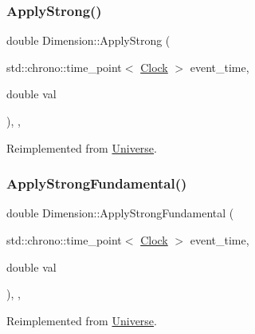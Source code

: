 \subsubsection{\texorpdfstring{Apply\+Strong()}{ApplyStrong()}}
{\footnotesize\ttfamily double Dimension\+::\+Apply\+Strong (\begin{DoxyParamCaption}\item[{std\+::chrono\+::time\+\_\+point$<$ \mbox{\hyperlink{universe_8h_a0ef8d951d1ca5ab3cfaf7ab4c7a6fd80}{Clock}} $>$}]{event\+\_\+time,  }\item[{double}]{val }\end{DoxyParamCaption})\hspace{0.3cm}{\ttfamily [inline]}, {\ttfamily [final]}, {\ttfamily [virtual]}}



Reimplemented from \mbox{\hyperlink{classUniverse_a906a88b37f10bfa630bef49dfd0e907a}{Universe}}.

\mbox{\label{classDimension_afb01fb9e469da18899d4b14e5f095ece}} 
\subsubsection{\texorpdfstring{Apply\+Strong\+Fundamental()}{ApplyStrongFundamental()}}
{\footnotesize\ttfamily double Dimension\+::\+Apply\+Strong\+Fundamental (\begin{DoxyParamCaption}\item[{std\+::chrono\+::time\+\_\+point$<$ \mbox{\hyperlink{universe_8h_a0ef8d951d1ca5ab3cfaf7ab4c7a6fd80}{Clock}} $>$}]{event\+\_\+time,  }\item[{double}]{val }\end{DoxyParamCaption})\hspace{0.3cm}{\ttfamily [inline]}, {\ttfamily [final]}, {\ttfamily [virtual]}}



Reimplemented from \mbox{\hyperlink{classUniverse_a62789bcff84bd750b0366004381e2fdd}{Universe}}.

\mbox{\label{classDimension_a2ae0b6a8ee17f6e28b6d2d3209df4bf4}} 
